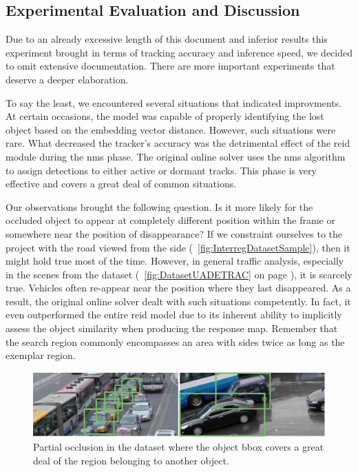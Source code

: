 
\subsection{Experimental Evaluation and Discussion}

Due to an already excessive length of this document and inferior results this experiment brought in terms of tracking accuracy and inference speed, we decided to omit extensive documentation. There are more important experiments that deserve a deeper elaboration.

To say the least, we encountered several situations that indicated improvments. At certain occasions, the model was capable of properly identifying the lost object based on the embedding vector distance. However, such situations were rare. What decreased the tracker's accuracy was the detrimental effect of the \gls{reid} module during the \gls{nms} phase. The original online solver uses the \gls{nms} algorithm to assign detections to either active or dormant tracks. This phase is very effective and covers a great deal of common situations.

Our observations brought the following question. Is it more likely for the occluded object to appear at completely different position within the frame or somewhere near the position of disappearance? If we constraint ourselves to the \interreg{} project with the road viewed from the side (\figtext{}~\ref{fig:InterregDatasetSample}), then it might hold true most of the time. However, in general traffic analysis, especially in the scenes from the \uadetrac{} dataset (\figtext{}~\ref{fig:DatasetUADETRAC} on page \pageref{fig:DatasetUADETRAC}), it is scarcely true. Vehicles often re-appear near the position where they last disappeared. As a result, the original online solver dealt with such situations competently. In fact, it even outperformed the entire \gls{reid} model due to its inherent ability to implicitly assess the object similarity when producing the response map. Remember that the search region commonly encompasses an area with sides twice as long as the exemplar region.

\begin{figure}[!t]
    \centering
    \includegraphics[width=\linewidth]{figures/siamese_tracking/uadetrac_partial_occlusion_multiple_cars.pdf}
    \caption[Partial occlusion in \uadetrac{} dataset]{Partial occlusion in the \uadetrac{} dataset where the object \gls{bbox} covers a great deal of the region belonging to another object.}
    \label{fig:UADETRACPartialOcclusionMultiple}
\end{figure}

